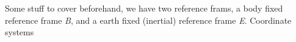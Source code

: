 \documentclass{article}
\begin{document}
Some stuff to cover beforehand, we have two reference frams, a body fixed reference frame \textit{B}, and a earth fixed (inertial) reference frame \textit{E}. Coordinate systems 
\end{document}
